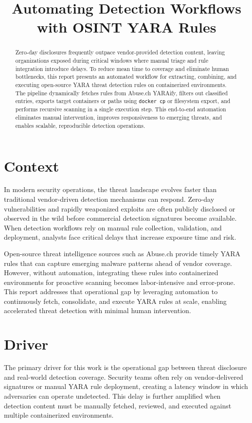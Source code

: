 \documentclass[conference]{IEEEtran}
\title{Automating Detection Workflows with OSINT YARA Rules}
\author{
\IEEEauthorblockN{Abderrahim Mayaba}
\IEEEauthorblockA{
ammayaba@gmail.com}
}
\begin{document}
\maketitle

\begin{abstract}
Zero-day disclosures frequently outpace vendor-provided detection content, leaving organizations exposed during critical windows where manual triage and rule integration introduce delays. To reduce mean time to coverage and eliminate human bottlenecks, this report presents an automated workflow for extracting, combining, and executing open-source YARA threat detection rules on containerized environments. The pipeline dynamically fetches rules from Abuse.ch YARAify, filters out classified entries, exports target containers or paths using \texttt{docker cp} or filesystem export, and performs recursive scanning in a single execution step. This end-to-end automation eliminates manual intervention, improves responsiveness to emerging threats, and enables scalable, reproducible detection operations.
\end{abstract}

\section{Context}
In modern security operations, the threat landscape evolves faster than traditional vendor-driven detection mechanisms can respond. Zero-day vulnerabilities and rapidly weaponized exploits are often publicly disclosed or observed in the wild before commercial detection signatures become available. When detection workflows rely on manual rule collection, validation, and deployment, analysts face critical delays that increase exposure time and risk.

Open-source threat intelligence sources such as Abuse.ch provide timely YARA rules that can capture emerging malware patterns ahead of vendor coverage. However, without automation, integrating these rules into containerized environments for proactive scanning becomes labor-intensive and error-prone. This report addresses that operational gap by leveraging automation to continuously fetch, consolidate, and execute YARA rules at scale, enabling accelerated threat detection with minimal human intervention.
\section{Driver}
The primary driver for this work is the operational gap between threat disclosure and real-world detection coverage. Security teams often rely on vendor-delivered signatures or manual YARA rule deployment, creating a latency window in which adversaries can operate undetected. This delay is further amplified when detection content must be manually fetched, reviewed, and executed against multiple containerized environments.
\end{document}
